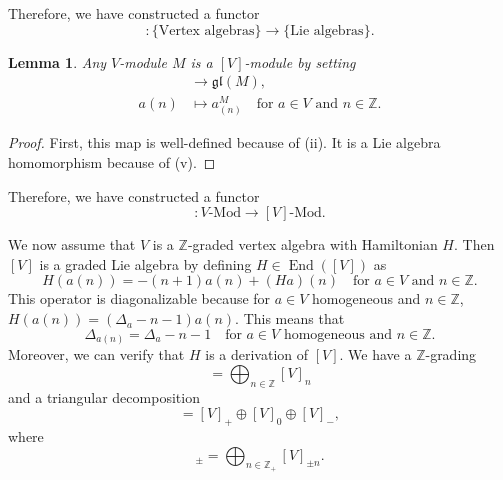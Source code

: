 \documentclass[a4paper, 12pt, reqno]{amsart}
\newtheorem{lemma}[theorem]{Lemma}
\theoremstyle{remark}
\DeclareMathOperator{\End}{End}
\begin{document}
Therefore, we have constructed a functor
\begin{equation*}
  [\bullet]: \{\text{Vertex algebras}\} \to \{\text{Lie algebras}\}.
\end{equation*}

\begin{lemma}
  \label{lmm:15}
  Any $V$-module $M$ is a $[V]$-module by setting
  \begin{align*}
    [V] &\to \mathfrak{gl}(M), \\
    a(n) &\mapsto a^M_{(n)} \quad \text{for $a \in V$ and $n \in \mathbb{Z}$}.
  \end{align*}
\end{lemma}

\begin{proof}
  First, this map is well-defined because of (ii).
  It is a Lie algebra homomorphism because of (v).
\end{proof}

Therefore, we have constructed a functor
\begin{equation*}
  [\bullet]: \text{$V$-Mod} \to \text{$[V]$-Mod}.
\end{equation*}

We now assume that $V$ is a $\mathbb{Z}$-graded vertex algebra with Hamiltonian $H$.
Then $[V]$ is a graded Lie algebra by defining $H \in \End([V])$ as
\begin{equation*}
  H(a(n)) = -(n + 1)a(n) + (Ha)(n) \quad \text{for $a \in V$ and $n \in \mathbb{Z}$}.
\end{equation*}
This operator is diagonalizable because for $a \in V$ homogeneous and $n \in \mathbb{Z}$, $H(a(n)) = (\Delta_a - n - 1)a(n)$.
This means that
\begin{equation*}
  \Delta_{a(n)} = \Delta_a - n - 1 \quad \text{for $a \in V$ homogeneous and $n \in \mathbb{Z}$}.
\end{equation*}
Moreover, we can verify that $H$ is a derivation of $[V]$.
We have a $\mathbb{Z}$-grading
\begin{equation*}
  [V] = \bigoplus_{n \in \mathbb{Z}}[V]_n
\end{equation*}
and a triangular decomposition
\begin{equation*}
  [V] = [V]_+ \oplus [V]_0 \oplus [V]_-,
\end{equation*}
where
\begin{equation*}
  [V]_{\pm} = \bigoplus_{n \in \mathbb{Z}_+}[V]_{\pm n}.
\end{equation*}
\end{document}
